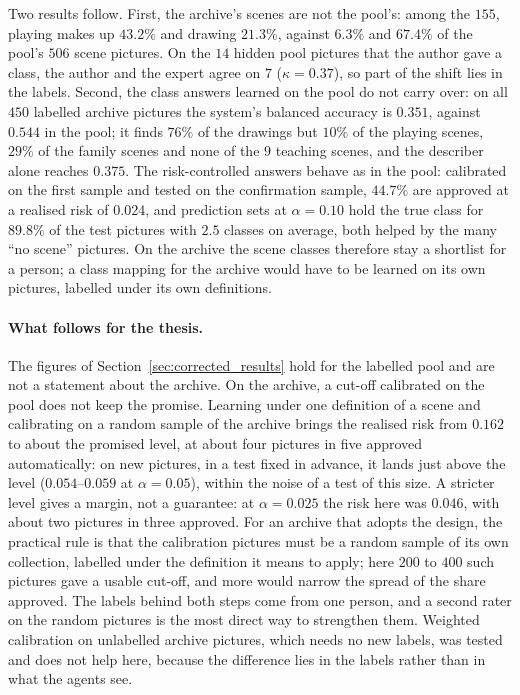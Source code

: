 Two results follow. First, the archive's scenes are not the pool's: among the $155$, playing makes up $43.2\%$ and drawing $21.3\%$, against $6.3\%$ and $67.4\%$ of the pool's $506$ scene pictures. On the $14$ hidden pool pictures that the author gave a class, the author and the expert agree on $7$ ($\kappa = 0.37$), so part of the shift lies in the labels. Second, the class answers learned on the pool do not carry over: on all $450$ labelled archive pictures the system's balanced accuracy is $0.351$, against $0.544$ in the pool; it finds $76\%$ of the drawings but $10\%$ of the playing scenes, $29\%$ of the family scenes and none of the $9$ teaching scenes, and the describer alone reaches $0.375$. The risk-controlled answers behave as in the pool: calibrated on the first sample and tested on the confirmation sample, $44.7\%$ are approved at a realised risk of $0.024$, and prediction sets at $\alpha = 0.10$ hold the true class for $89.8\%$ of the test pictures with $2.5$ classes on average, both helped by the many ``no scene'' pictures. On the archive the scene classes therefore stay a shortlist for a person; a class mapping for the archive would have to be learned on its own pictures, labelled under its own definitions.

\paragraph{What follows for the thesis.} The figures of Section~\ref{sec:corrected_results} hold for the labelled pool and are not a statement about the archive. On the archive, a cut-off calibrated on the pool does not keep the promise. Learning under one definition of a scene and calibrating on a random sample of the archive brings the realised risk from $0.162$ to about the promised level, at about four pictures in five approved automatically: on new pictures, in a test fixed in advance, it lands just above the level ($0.054$--$0.059$ at $\alpha = 0.05$), within the noise of a test of this size. A stricter level gives a margin, not a guarantee: at $\alpha = 0.025$ the risk here was $0.046$, with about two pictures in three approved. For an archive that adopts the design, the practical rule is that the calibration pictures must be a random sample of its own collection, labelled under the definition it means to apply; here $200$ to $400$ such pictures gave a usable cut-off, and more would narrow the spread of the share approved. The labels behind both steps come from one person, and a second rater on the random pictures is the most direct way to strengthen them. Weighted calibration on unlabelled archive pictures, which needs no new labels, was tested and does not help here, because the difference lies in the labels rather than in what the agents see.

